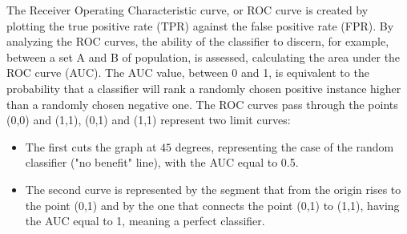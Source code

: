 \documentclass{standalone}
\begin{document}
The Receiver Operating Characteristic curve, or ROC curve is created by plotting the true positive rate (TPR) against the false positive rate (FPR).
By analyzing the ROC curves, the ability of the classifier to discern, for example, between a set A and B of population, is assessed, calculating the area under the ROC curve (AUC). 
The AUC value, between 0 and 1, is equivalent to the probability that a classifier will rank a randomly chosen positive instance higher than a randomly chosen negative one.
The ROC curves pass through the points (0,0) and (1,1), (0,1) and (1,1) represent two limit curves:
\begin{itemize}
    \item The first cuts the graph at $45$ degrees, representing the case of the random classifier ("no benefit" line), with the AUC equal to 0.5.
    \item The second curve is represented by the segment that from the origin rises to the point (0,1) and by the one that connects the point (0,1) to (1,1), having the AUC equal to 1, meaning a perfect classifier.
\end{itemize}
\end{document}
